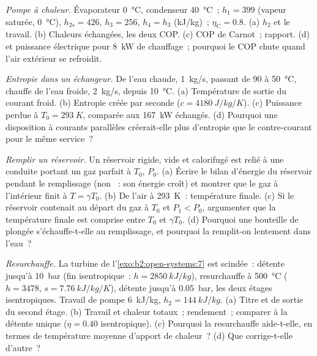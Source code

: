 \begin{exercise}[$\star\star$]\label{exo:b2:open-systems:8}
\emph{Pompe à chaleur.} Évaporateur \qty{0}{\celsius}, condenseur \qty{40}{\celsius}~;
$h_1 = 399$ (vapeur saturée, \qty{0}{\celsius}), $h_{2s} = 426$, $h_3 = 256$,
$h_4 = h_3$ (\unit{kJ/kg})~; $\eta_{\text{C}} = 0.8$. (a) $h_2$ et le travail.
(b) Chaleurs échangées, les deux COP. (c) COP de Carnot~; rapport. (d) 
et puissance électrique pour \qty{8}{kW} de chauffage~; pourquoi le COP chute quand
l'air extérieur se refroidit.
\end{exercise}

\begin{exercise}[$\star\star$]\label{exo:b2:open-systems:9}
\emph{Entropie dans un échangeur.} De l'eau chaude, \qty{1}{kg/s}, passant de \qty{90}{} à
\qty{50}{\celsius}, chauffe de l'eau froide, \qty{2}{kg/s}, depuis \qty{10}{\celsius}.
(a) Température de sortie du courant froid. (b) Entropie créée par
seconde ($c = \qty{4180}{J/kg/K}$). (c) Puissance perdue à $T_0 = \qty{293}{K}$,
comparée aux \qty{167}{kW} échangés. (d) Pourquoi une disposition à courants
parallèles créerait-elle plus d'entropie que le contre-courant pour le même service~?
\end{exercise}

\begin{exercise}[$\star\star\star$]\label{exo:b2:open-systems:10}
\emph{Remplir un réservoir.} Un réservoir rigide, vide et calorifugé est relié
à une conduite portant un gaz parfait à $T_0$, $P_0$. (a) Écrire le bilan d'énergie
du réservoir pendant le remplissage (non ~: son énergie croît) et
montrer que le gaz à l'intérieur finit à $T = \gamma T_0$. (b) De l'air à \qty{293}{K}~:
température finale. (c) Si le réservoir contenait au départ du gaz à $T_0$ et
$P_1 < P_0$, argumenter que la température finale est comprise entre $T_0$ et
$\gamma T_0$. (d) Pourquoi une bouteille de plongée s'échauffe-t-elle au remplissage, et pourquoi
la remplit-on lentement dans l'eau~?
\end{exercise}

\begin{exercise}[$\star\star\star$]\label{exo:b2:open-systems:11}
\emph{Resurchauffe.} La turbine de l'\cref{exo:b2:open-systems:7} est scindée~:
détente jusqu'à \qty{10}{bar} (fin isentropique~: $h = \qty{2850}{kJ/kg}$), resurchauffe
à \qty{500}{\celsius} ($h = 3478$, $s = \qty{7.76}{kJ/kg/K}$), détente jusqu'à
\qty{0.05}{bar}, les deux étages isentropiques. Travail de pompe \qty{6}{kJ/kg}, $h_2 =
\qty{144}{kJ/kg}$. (a) Titre et  de sortie du second étage. (b)
Travail et chaleur totaux~; rendement~; comparer à la détente unique
($\eta = 0.40$ isentropique). (c) Pourquoi la resurchauffe aide-t-elle, en termes de
température moyenne d'apport de chaleur~? (d) Que corrige-t-elle d'autre~?
\end{exercise}

